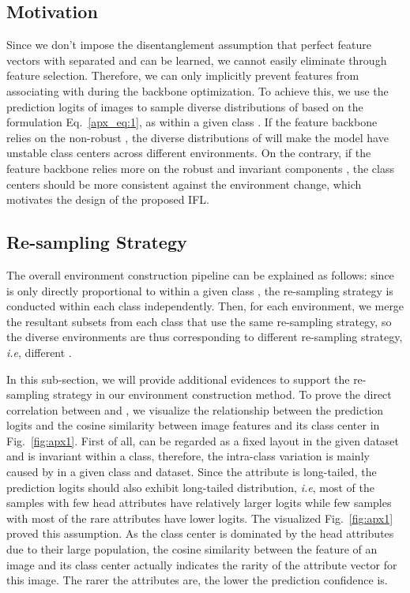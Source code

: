 \documentclass{article}
\def\ie{\emph{i.e}} \def\Ie{\emph{I.e}}
\begin{document}
\subsection{Motivation}
Since we don't impose the disentanglement assumption that perfect feature vectors  with separated  and  can be learned, we cannot easily eliminate  through feature selection. Therefore, we can only implicitly prevent features from associating with  during the backbone optimization. To achieve this, we use the prediction logits of images to sample diverse distributions of  based on the formulation Eq.~\eqref{apx_eq:1}, as  within a given class . If the feature backbone relies on the non-robust , the diverse distributions of  will make the model have unstable class centers across different environments. On the contrary, if the feature backbone relies more on the robust and invariant components , the class centers should be more consistent against the environment change, which motivates the design of the proposed IFL. 

\subsection{Re-sampling Strategy}
The overall environment construction pipeline can be explained as follows: since  is only directly proportional to  within a given class , the re-sampling strategy is conducted within each class independently. Then, for each environment, we merge the resultant subsets from each class that use the same re-sampling strategy, so the diverse environments are thus corresponding to different re-sampling strategy, \ie, different . 

In this sub-section, we will provide additional evidences to support the re-sampling strategy in our  environment construction method.
To prove the direct correlation between  and , we visualize the relationship between the prediction logits and the cosine similarity between image features and its class center in Fig.~\ref{fig:apx1}. First of all,  can be regarded as a fixed layout in the given dataset and  is invariant within a class, therefore, the intra-class variation is mainly caused by  in a given class and dataset. Since the attribute  is long-tailed, the prediction logits should also exhibit long-tailed distribution, \ie, most of the samples with few head attributes have relatively larger logits while few samples with most of the rare attributes have lower logits. The visualized Fig.~\ref{fig:apx1} proved this assumption. As the class center is dominated by the head attributes due to their large population, the cosine similarity between the feature of an image and its class center actually indicates the rarity of the attribute vector  for this image. The rarer the attributes are, the lower the prediction confidence is.
\end{document}
